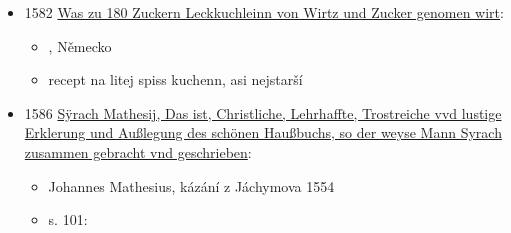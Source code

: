 \begin{itemize}
\begin{itemize}
    \begin{itemize}
    \tightlist
    \item
      Vezmi teplé mléko a rozšlehej do něj vejce / zadělej těsto s
      pěknou bílou moukou / přidej k tomu trochu pivních kvasnic a másla
      / nech ho chvíli stát za kamny, aby vzešlo / pak ho znovu prohněť
      dohromady / a trochu ho osol / poté ho pěkně čistě vyválej /
      {[}a{]} rozhoď na něj černé rozinky.
    \item
      Vezmi válec, který je pěkně teplý a potřený máslem / a polož ho na
      těsto / těsto přes něj přehň (naviň) / a svaž ho režnou nití
      dohromady, aby nespadlo / dej to k ohni / a pěkně pomalu s ním
      otáčej, tak se čistě upeče.
    \item
      A když začne hnědnout / vezmi mašlovačku (štětec) / namoč ji do
      horkého másla / a potírej jím ten koláč, tak získá pěknou hnědavou
      barvu.
    \item
      A když je upečený / sejmi ho z rožně s válcem / a ucpi oba otvory
      čistými utěrkami, aby v něm zůstalo teplo / nechej ho tak, dokud
      nevychladne / pak ho podávej studený na stůl, tak bude pěkně
      křehký a dobrý.
    \item
      A nazývá se to Spießkuchen.
    \end{itemize}
  \end{itemize}
\item
  1582 \href{https://cakes.institute/harsdorfer.html}{Was zu 180 Zuckern
  Leckkuchleinn von Wirtz und Zucker genomen wirt}:

  \begin{itemize}
  \tightlist
  \item
     , Německo
  \item
    recept na litej spiss kuchenn, asi nejstarší
  \end{itemize}
\item
  1586
  \href{https://books.google.cz/books?id=wN9YAAAAcAAJ&vq=ayerkuch&hl=cs&pg=PA101-IA1\#v=onepage&q&f=false}{Sÿrach
  Mathesij, Das ist, Christliche, Lehrhaffte, Trostreiche vvd lustige
  Erklerung und Außlegung des schönen Haußbuchs, so der weyse Mann
  Syrach zusammen gebracht vnd geschrieben}:

  \begin{itemize}
  \tightlist
  \item
    Johannes Mathesius, kázání z Jáchymova 1554
  \item
    s. 101:


\end{itemize}
\end{itemize}
